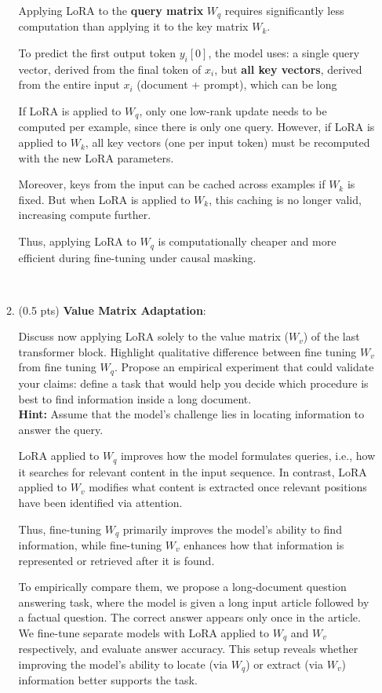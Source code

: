 \begin{enumerate}
\begin{enumerate}
\begin{answerbox}[2.5in]
Applying LoRA to the \textbf{query matrix} $W_q$ requires significantly less
computation than applying it to the key matrix $W_k$.

To predict the first output token $y_i[0]$, the model uses: a single query
vector, derived from the final token of $x_i$, but \textbf{all key vectors},
derived from the entire input $x_i$ (document + prompt), which can be long

If LoRA is applied to $W_q$, only one low-rank update needs to be computed per
example, since there is only one query. However, if LoRA is applied to $W_k$,
all key vectors (one per input token) must be recomputed with the new LoRA
parameters.

Moreover, keys from the input can be cached across examples if $W_k$ is fixed.
But when LoRA is applied to $W_k$, this caching is no longer valid, increasing
compute further.

Thus, applying LoRA to $W_q$ is computationally cheaper and more efficient
during fine-tuning under causal masking.
\end{answerbox}

~

\item (0.5 pts) \textbf{Value Matrix Adaptation}:  

Discuss now applying LoRA solely to the value matrix ($W_v$) of the last
transformer block. Highlight qualitative difference between fine tuning $W_v$
from fine tuning $W_q$. Propose an empirical experiment that could validate your
claims: define a task that would help you decide which procedure is best to find
information inside a long document.\\ {\bf Hint:} Assume that the model's
challenge lies in locating information to answer the query.

\begin{answerbox}[3in]
LoRA applied to $W_q$ improves how the model formulates queries, i.e., how it searches for relevant content in the input sequence. In contrast, LoRA applied to $W_v$ modifies what content is extracted once relevant positions have been identified via attention.

Thus, fine-tuning $W_q$ primarily improves the model's ability to find information, while fine-tuning $W_v$ enhances how that information is represented or retrieved after it is found.

To empirically compare them, we propose a long-document question answering task, where the model is given a long input article followed by a factual question. The correct answer appears only once in the article. We fine-tune separate models with LoRA applied to $W_q$ and $W_v$ respectively, and evaluate answer accuracy. This setup reveals whether improving the model’s ability to locate (via $W_q$) or extract (via $W_v$) information better supports the task.
\end{answerbox}


\end{enumerate}
\end{enumerate}
